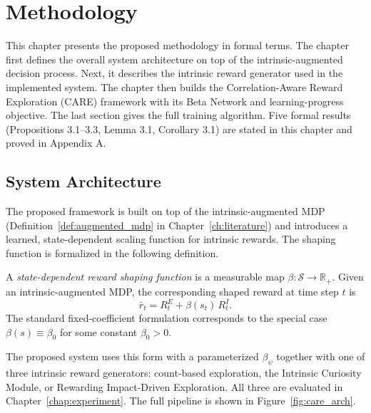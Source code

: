 \chapter{Methodology}
\label{ch:methodology}

This chapter presents the proposed methodology in formal terms. The chapter first defines the overall system architecture on top of the intrinsic-augmented decision process. Next, it describes the intrinsic reward generator used in the implemented system. The chapter then builds the Correlation-Aware Reward Exploration (CARE) framework with its Beta Network and learning-progress objective. The last section gives the full training algorithm. Five formal results (Propositions 3.1--3.3, Lemma 3.1, Corollary 3.1) are stated in this chapter and proved in Appendix A.

\section{System Architecture}
\label{sec:system_architecture}

The proposed framework is built on top of the intrinsic-augmented MDP (Definition~\ref{def:augmented_mdp} in Chapter~\ref{ch:literature}) and introduces a learned, state-dependent scaling function for intrinsic rewards. The shaping function is formalized in the following definition.

\begin{definition}
\label{def:reward_shaping}
A \emph{state-dependent reward shaping function} is a measurable map $\beta : \mathcal{S} \to \mathbb{R}_+$. Given an intrinsic-augmented MDP, the corresponding shaped reward at time step $t$ is
\begin{equation}
\bar{r}_t = R_t^E + \beta(s_t)\, R_t^I.
\label{eq:shaped_reward}
\end{equation}
The standard fixed-coefficient formulation corresponds to the special case $\beta(s) \equiv \beta_0$ for some constant $\beta_0 > 0$.
\end{definition}

The proposed system uses this form with a parameterized $\beta_\psi$ together with one of three intrinsic reward generators: count-based exploration, the Intrinsic Curiosity Module, or Rewarding Impact-Driven Exploration. All three are evaluated in Chapter~\ref{chap:experiment}. The full pipeline is shown in Figure~\ref{fig:care_arch}.


